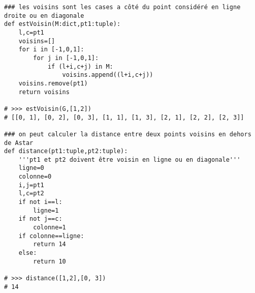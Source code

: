 \begin{lstlisting}
### les voisins sont les cases a côté du point considéré en ligne droite ou en diagonale
def estVoisin(M:dict,pt1:tuple):
    l,c=pt1
    voisins=[]
    for i in [-1,0,1]:
        for j in [-1,0,1]:
            if (l+i,c+j) in M:
                voisins.append((l+i,c+j))
    voisins.remove(pt1)
    return voisins

# >>> estVoisin(G,[1,2])
# [[0, 1], [0, 2], [0, 3], [1, 1], [1, 3], [2, 1], [2, 2], [2, 3]]

### on peut calculer la distance entre deux points voisins en dehors de Astar
def distance(pt1:tuple,pt2:tuple):
    '''pt1 et pt2 doivent être voisin en ligne ou en diagonale'''
    ligne=0
    colonne=0
    i,j=pt1
    l,c=pt2
    if not i==l:
        ligne=1
    if not j==c:
        colonne=1
    if colonne==ligne:
        return 14
    else:
        return 10

# >>> distance([1,2],[0, 3])
# 14


\end{lstlisting}
